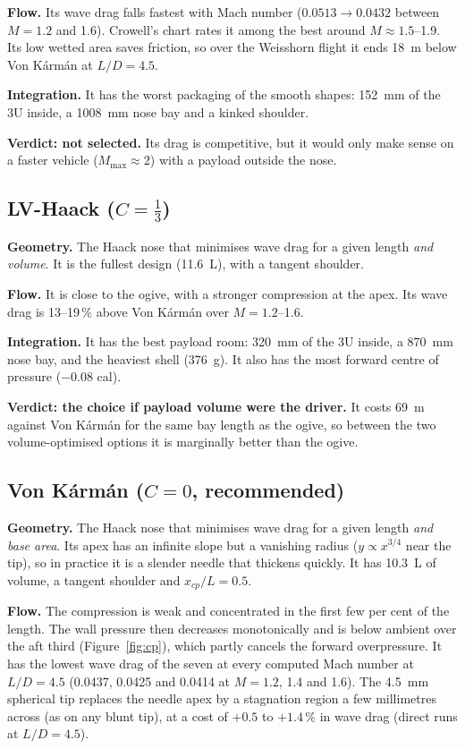 \textbf{Flow.} Its wave drag falls fastest with Mach number ($0.0513 \rightarrow 0.0432$ between
$M = 1.2$ and 1.6). Crowell's chart rates it among the best around $M \approx 1.5$--1.9. Its
low wetted area saves friction, so over the Weisshorn flight it ends \SI{18}{m} below
Von K\'arm\'an at $L/D = 4.5$.

\textbf{Integration.} It has the worst packaging of the smooth shapes: \SI{152}{mm} of the 3U
inside, a \SI{1008}{mm} nose bay and a kinked shoulder.

\textbf{Verdict: not selected.} Its drag is competitive, but it would only make sense on a
faster vehicle ($M_{\max} \approx 2$) with a payload outside the nose.

\subsection{LV-Haack ($C = \tfrac13$)}

\textbf{Geometry.} The Haack nose that minimises wave drag for a given length \emph{and volume}. It
is the fullest design (\SI{11.6}{L}), with a tangent shoulder.

\textbf{Flow.} It is close to the ogive, with a stronger compression at the apex. Its wave drag is
13--19\,\% above Von K\'arm\'an over $M = 1.2$--1.6.

\textbf{Integration.} It has the best payload room: \SI{320}{mm} of the 3U inside, a \SI{870}{mm}
nose bay, and the heaviest shell (\SI{376}{g}). It also has the most forward centre of pressure
($-0.08$ cal).

\textbf{Verdict: the choice if payload volume were the driver.} It costs \SI{69}{m} against
Von K\'arm\'an for the same bay length as the ogive, so between the two volume-optimised options
it is marginally better than the ogive.

\subsection{Von K\'arm\'an ($C = 0$, recommended)}

\textbf{Geometry.} The Haack nose that minimises wave drag for a given length \emph{and base area}.
Its apex has an infinite slope but a vanishing radius ($y \propto x^{3/4}$ near the tip), so in
practice it is a slender needle that thickens quickly. It has \SI{10.3}{L} of volume, a tangent
shoulder and $x_{cp}/L = 0.5$.

\textbf{Flow.} The compression is weak and concentrated in the first few per cent of the length.
The wall pressure then decreases monotonically and is below ambient over the aft third
(Figure~\ref{fig:cp}), which partly cancels the forward overpressure. It has the lowest wave drag
of the seven at every computed Mach number at $L/D = 4.5$ (0.0437, 0.0425 and 0.0414 at
$M = 1.2$, 1.4 and 1.6). The \SI{4.5}{mm} spherical tip replaces the needle apex by a
stagnation region a few millimetres across (as on any blunt tip), at a cost of $+0.5$ to $+1.4\,\%$
in wave drag (direct runs at $L/D = 4.5$).

